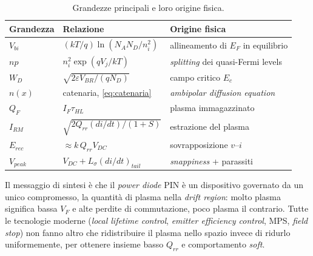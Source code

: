 \documentclass[11pt,a4paper]{article}
\begin{document}
\begin{table}[htbp]
\centering
\caption{Grandezze principali e loro origine fisica.}
\begin{tabular}{lll}
\toprule
Grandezza & Relazione & Origine fisica \\
\midrule
$V_{bi}$ & $(kT/q)\ln(N_A N_D/n_i^2)$ & allineamento di $E_F$ in equilibrio \\
$np$ & $n_i^2 \exp(qV_j/kT)$ & \emph{splitting} dei quasi-Fermi levels \\
$W_D$ & $\sqrt{2\varepsilon V_{BR}/(qN_D)}$ & campo critico $E_c$ \\
$n(x)$ & catenaria, \eqref{eq:catenaria} & \emph{ambipolar diffusion equation} \\
$Q_F$ & $I_F \tau_{HL}$ & plasma immagazzinato \\
$I_{RM}$ & $\sqrt{2 Q_{rr} (di/dt)/(1+S)}$ & estrazione del plasma \\
$E_{rec}$ & $\approx k\, Q_{rr} V_{DC}$ & sovrapposizione $v$--$i$ \\
$V_{peak}$ & $V_{DC} + L_\sigma (di/dt)_{tail}$ & \emph{snappiness} + parassiti \\
\bottomrule
\end{tabular}
\end{table}

Il messaggio di sintesi è che il \emph{power diode} PIN è un dispositivo
governato da un unico compromesso, la quantità di plasma nella
\emph{drift region}: molto plasma significa bassa $V_F$ e alte perdite di
commutazione, poco plasma il contrario. Tutte le tecnologie moderne
(\emph{local lifetime control}, \emph{emitter efficiency control}, MPS,
\emph{field stop}) non fanno altro che ridistribuire il plasma nello spazio
invece di ridurlo uniformemente, per ottenere insieme basso $Q_{rr}$ e
comportamento \emph{soft}.
\end{document}
